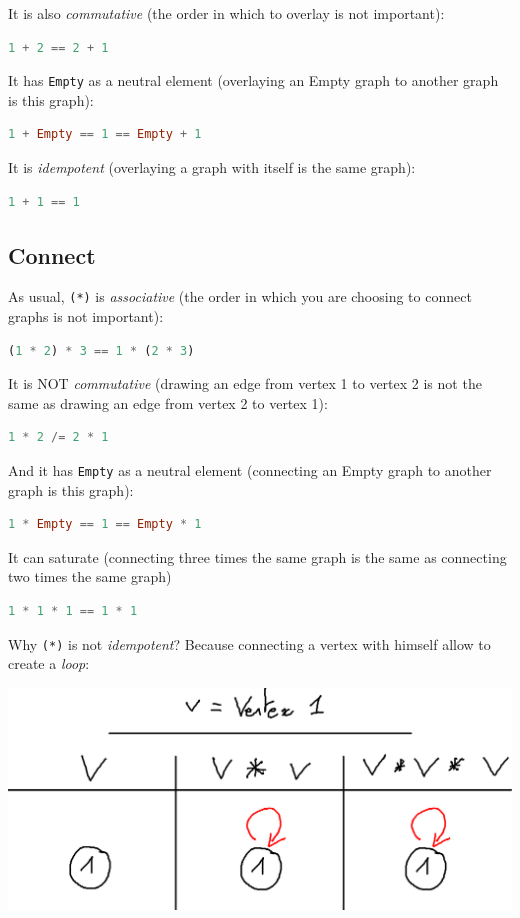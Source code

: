 \documentclass[10pt,a4paper]{article}
\begin{document}
It is also \emph{commutative} (the order in which to overlay is not important):
\begin{lstlisting}[language=Haskell, frame=single]
1 + 2 == 2 + 1
\end{lstlisting}

It has \verb|Empty| as a neutral element (overlaying an Empty graph to another graph is this graph):
\begin{lstlisting}[language=Haskell, frame=single]
1 + Empty == 1 == Empty + 1
\end{lstlisting}

It is \emph{idempotent} (overlaying a graph with itself is the same graph):
\begin{lstlisting}[language=Haskell, frame=single]
1 + 1 == 1
\end{lstlisting}

\subsection{Connect}
As usual, \verb|(*)| is \emph{associative} (the order in which you are choosing to connect graphs is not important):
\begin{lstlisting}[language=Haskell, frame=single]
(1 * 2) * 3 == 1 * (2 * 3)
\end{lstlisting}

It is NOT \emph{commutative} (drawing an edge from vertex 1 to vertex 2 is not the same as drawing an edge from vertex 2 to vertex 1):
\begin{lstlisting}[language=Haskell, frame=single]
1 * 2 /= 2 * 1
\end{lstlisting}

And it has \verb|Empty| as a neutral element (connecting an Empty graph to another graph is this graph):
\begin{lstlisting}[language=Haskell, frame=single]
1 * Empty == 1 == Empty * 1
\end{lstlisting}

It can saturate (connecting three times the same graph is the same as connecting two times the same graph)
\begin{lstlisting}[language=Haskell, frame=single]
1 * 1 * 1 == 1 * 1
\end{lstlisting}

Why \verb|(*)| is not \emph{idempotent}? Because connecting a vertex with himself allow to create a \emph{loop}:

\begin{center}
	\includegraphics[scale=0.5]{figspng/saturate.png}
\end{center}
\end{document}
